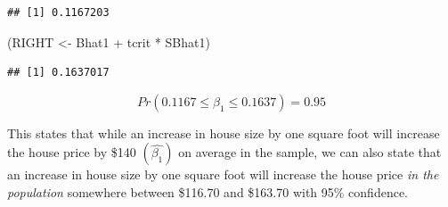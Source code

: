 \documentclass[
]{book}
\newenvironment{Shaded}{\begin{snugshade}}{\end{snugshade}}
\newcommand{\AttributeTok}[1]{\textcolor[rgb]{0.77,0.63,0.00}{#1}}
\newcommand{\CommentTok}[1]{\textcolor[rgb]{0.56,0.35,0.01}{\textit{#1}}}
\newcommand{\ConstantTok}[1]{\textcolor[rgb]{0.00,0.00,0.00}{#1}}
\newcommand{\DecValTok}[1]{\textcolor[rgb]{0.00,0.00,0.81}{#1}}
\newcommand{\FloatTok}[1]{\textcolor[rgb]{0.00,0.00,0.81}{#1}}
\newcommand{\FunctionTok}[1]{\textcolor[rgb]{0.00,0.00,0.00}{#1}}
\newcommand{\NormalTok}[1]{#1}
\newcommand{\OtherTok}[1]{\textcolor[rgb]{0.56,0.35,0.01}{#1}}
\newcommand{\SpecialCharTok}[1]{\textcolor[rgb]{0.00,0.00,0.00}{#1}}
\begin{document}
\begin{Shaded}
\end{Shaded}

\begin{verbatim}
## [1] 0.1167203
\end{verbatim}

\begin{Shaded}
\begin{Highlighting}[]
\NormalTok{(RIGHT }\OtherTok{\textless{}{-}}\NormalTok{ Bhat1 }\SpecialCharTok{+}\NormalTok{ tcrit }\SpecialCharTok{*}\NormalTok{ SBhat1)}
\end{Highlighting}
\end{Shaded}

\begin{verbatim}
## [1] 0.1637017
\end{verbatim}

\[Pr(0.1167 \leq \beta_1 \leq 0.1637)=0.95\]

This states that while an increase in house size by one square foot will increase the house price by \$140 \((\hat{\beta_1})\) on average in the sample, we can also state that an increase in house size by one square foot will increase the house price \emph{in the population} somewhere between \$116.70 and \$163.70 with 95\% confidence.
\end{document}

